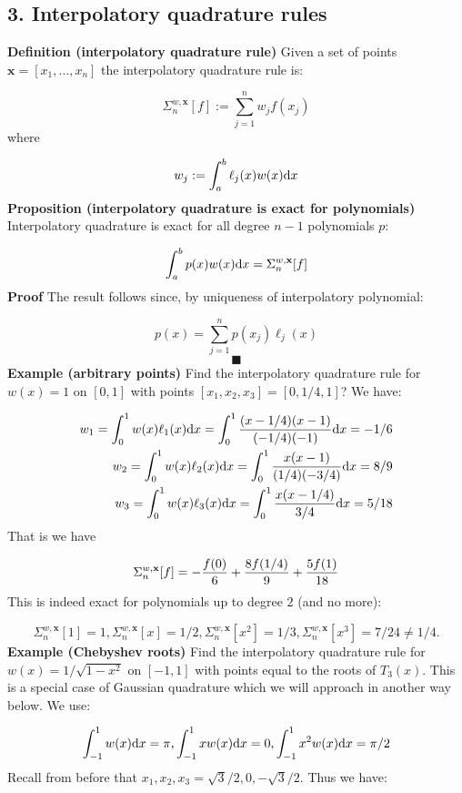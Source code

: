 \documentclass[12pt,a4paper]{article}
\begin{document}
\subsection{3. Interpolatory quadrature rules}
\textbf{Definition (interpolatory quadrature rule)} Given a set of points $\mathbf{x} = [x_1,\ensuremath{\ldots},x_n]$ the interpolatory quadrature rule is:

\[
\ensuremath{\Sigma}_n^{w,\mathbf{x}}[f] := \ensuremath{\sum}_{j=1}^n w_j f(x_j)
\]
where

\[
w_j := \ensuremath{\int}_a^b \ensuremath{\ell}_j(x) w(x) {\rm d} x
\]
\textbf{Proposition (interpolatory quadrature is exact for polynomials)}  Interpolatory quadrature is exact for all degree $n-1$ polynomials $p$:

\[
\ensuremath{\int}_a^b p(x) w(x) {\rm d}x = \ensuremath{\Sigma}_n^{w,\mathbf{x}}[f]
\]
\textbf{Proof} The result follows since, by uniqueness of interpolatory polynomial:

\[
p(x) = \ensuremath{\sum}_{j=1}^n p(x_j) \ensuremath{\ell}_j(x)
\]
\[
\blacksquare
\]
\textbf{Example (arbitrary points)} Find the interpolatory quadrature rule for $w(x) = 1$ on $[0,1]$ with  points $[x_1,x_2,x_3] = [0,1/4,1]$? We have:


\begin{align*}
w_1 = \int_0^1 w(x) \ensuremath{\ell}_1(x) {\rm d}x  = \int_0^1 {(x-1/4)(x-1) \over (-1/4)(-1)}{\rm d}x = -1/6 \\
w_2 = \int_0^1 w(x) \ensuremath{\ell}_2(x) {\rm d}x  = \int_0^1 {x(x-1) \over (1/4)(-3/4)}{\rm d}x = 8/9 \\
w_3 = \int_0^1 w(x) \ensuremath{\ell}_3(x) {\rm d}x  = \int_0^1 {x(x-1/4) \over 3/4}{\rm d}x = 5/18
\end{align*}
That is we have

\[
\ensuremath{\Sigma}_n^{w,\mathbf{x}}[f]  = -{f(0) \over 6} + {8f(1/4) \over 9} + {5 f(1) \over 18}
\]
This is indeed exact for polynomials up to degree $2$ (and no more):

\[
\ensuremath{\Sigma}_n^{w,\mathbf{x}}[1] = 1, \ensuremath{\Sigma}_n^{w,\mathbf{x}}[x] = 1/2, \ensuremath{\Sigma}_n^{w,\mathbf{x}}[x^2] = 1/3, \ensuremath{\Sigma}_n^{w,\mathbf{x}}[x^3] = 7/24 \ensuremath{\ne} 1/4.
\]
\textbf{Example (Chebyshev roots)} Find the interpolatory quadrature rule for $w(x) = 1/\sqrt{1-x^2}$ on $[-1,1]$ with points equal to the roots of $T_3(x)$. This is a special case of Gaussian quadrature which we will approach in another way below. We use:

\[
\int_{-1}^1 w(x) {\rm d}x = \ensuremath{\pi}, \int_{-1}^1 xw(x) {\rm d}x = 0, \int_{-1}^1 x^2 w(x) {\rm d}x = {\ensuremath{\pi}/2}
\]
Recall from before that $x_1,x_2,x_3 = \sqrt{3}/2,0,-\sqrt{3}/2$. Thus we have:
\end{document}
